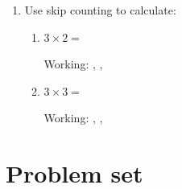 \documentclass{tufte-book}
\begin{document}
\begin{enumerate}
  \item Use skip counting to calculate:
  \begin{enumerate}\bigskip
    \item $3 \times 2 = $\dotfill\bigskip\par
      Working: \dotfill, \dotfill, \dotfill\bigskip
    \item $3 \times 3 = $\dotfill\bigskip\par
      Working: \dotfill, \dotfill, \dotfill\bigskip
  \end{enumerate}
\end{enumerate}

\clearpage\section{Problem set }
\end{document}
